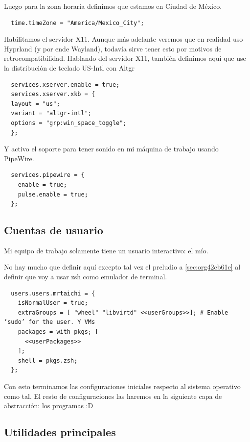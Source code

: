 \documentclass[11pt]{article}
\begin{document}
Luego para la zona horaria definimos que estamos en Ciudad de México.

\begin{verbatim}
  time.timeZone = "America/Mexico_City";
\end{verbatim}

Habilitamos el servidor X11. Aunque más adelante veremos que en realidad uso Hyprland (y por ende Wayland), todavía sirve tener esto por motivos de retrocompatibilidad. Hablando del servidor X11, también definimos aquí que use la distribución de teclado US-Intl con Altgr

\begin{verbatim}
  services.xserver.enable = true;
  services.xserver.xkb = {
  layout = "us";
  variant = "altgr-intl";
  options = "grp:win_space_toggle";
  };
\end{verbatim}

Y activo el soporte para tener sonido en mi máquina de trabajo usando PipeWire.

\begin{verbatim}
  services.pipewire = {
    enable = true;
    pulse.enable = true;
  };
\end{verbatim}
\subsection{Cuentas de usuario}
\label{sec:orgc3f24f1}

Mi equipo de trabajo solamente tiene un usuario interactivo: el mío.

No hay mucho que definir aquí excepto tal vez el preludio a \ref{sec:org42cb61e} al definir que voy a usar zsh como emulador de terminal.

\begin{verbatim}
  users.users.mrtaichi = {
    isNormalUser = true;
    extraGroups = [ "wheel" "libvirtd" <<userGroups>>]; # Enable ‘sudo’ for the user. Y VMs
    packages = with pkgs; [
      <<userPackages>>
    ];
    shell = pkgs.zsh;
  };
\end{verbatim}

Con esto terminamos las configuraciones iniciales respecto al sistema operativo como tal. El resto de configuraciones las haremos en la siguiente capa de abstracción: los programas :D
\subsection{Utilidades principales}
\label{sec:orgb372890}
\end{document}
